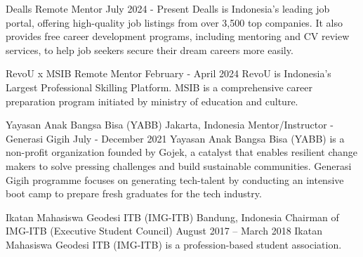 \resumeSubheading
{Dealls}
{Remote}
{Mentor}
{July 2024 - Present}
\small{Dealls is Indonesia's leading job portal, offering high-quality job listings from over 3,500 top companies. It also provides free career development programs, including mentoring and CV review services, to help job seekers secure their dream careers more easily.}
\vspace{-1pt}
\resumeItemListStart
{}
\resumeItemListEnd

\vspace{5pt}
\resumeSubheading
{RevoU x MSIB}
{Remote}
{Mentor}
{February - April 2024}
\small{RevoU is Indonesia’s Largest Professional Skilling Platform. MSIB is a comprehensive career preparation program initiated by ministry of education and culture.}
\vspace{-1pt}
\resumeItemListStart
{}
\resumeItemListEnd

\vspace{5pt}
\resumeSubheading
{Yayasan Anak Bangsa Bisa (YABB)}
{Jakarta, Indonesia}
{Mentor/Instructor - Generasi Gigih}
{July - December 2021}
\small{Yayasan Anak Bangsa Bisa (YABB) is a non-profit organization founded by Gojek, a
catalyst that enables resilient change makers to solve pressing challenges and build
sustainable communities. Generasi Gigih programme focuses on generating tech-talent
by conducting an intensive boot camp to prepare fresh graduates for the tech industry.}
\vspace{-1pt}
\resumeItemListStart
{}
\resumeItemListEnd

\vspace{5pt}
\resumeSubheading
{Ikatan Mahasiswa Geodesi ITB (IMG-ITB)}
{Bandung, Indonesia}
{Chairman of IMG-ITB (Executive Student Council)}
{August 2017 – March 2018}
\small{Ikatan Mahasiswa Geodesi ITB (IMG-ITB) is a profession-based student association.}
\vspace{-1pt}
\resumeItemListStart
{}
\resumeItemListEnd
